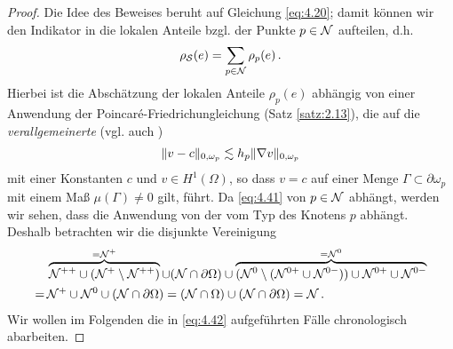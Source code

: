 \begin{proof}
Die Idee des Beweises beruht auf Gleichung \eqref{eq:4.20}; damit können wir den Indikator in die lokalen Anteile bzgl. der Punkte $p \in \mathcal N$ aufteilen, d.h.
\begin{align}\label{eq:4.40}
	\rho_{\mathcal S} (e) = \sum_{p \in \mathcal N} \rho_p (e) \, .
\end{align}
Hierbei ist die Abschätzung der lokalen Anteile $\rho_p(e)$ abhängig von einer Anwendung der Poincaré-Friedrichungleichung (Satz \ref{satz:2.13}), die auf die \textit{verallgemeinerte } (vgl. auch \cite{Rudin})
\begin{align}\label{eq:4.41}
	\lVert v-c\rVert_{0,\omega_p} \lesssim h_p \lVert \nabla v\rVert_{0,\omega_p}
\end{align}
mit einer Konstanten $c$ und $v\in H^1(\Omega)$, so dass $v=c$ auf einer Menge $\Gamma \subset \partial \omega_p$ mit einem Maß $\mu (\Gamma)\not= 0$ gilt, führt. Da \eqref{eq:4.41} von $p\in \mathcal N$ abhängt, werden wir sehen, dass die Anwendung von der  vom Typ des Knotens $p$ abhängt. Deshalb betrachten wir die disjunkte Vereinigung
\begin{align}\notag
	& \overbrace{\mathcal N^{++} \cup (\mathcal N^+ \setminus \mathcal N^{++})}^{=\mathcal N^+} \cup (\mathcal N \cap \partial \Omega ) \cup\overbrace{ (\mathcal N^0 \setminus (\mathcal N^{0+} \cup \mathcal N^{0-}))  \cup \mathcal N^{0+} \cup \mathcal N^{0-}}^{= \mathcal N^0} \\
	\label{eq:4.42}
	= \, & \mathcal N^+ \cup \mathcal N^0 \cup (\mathcal N \cap \partial \Omega)  = (\mathcal N \cap \Omega) \cup (\mathcal N \cap \partial \Omega) = \mathcal N \, .
\end{align}
Wir wollen im Folgenden die in \eqref{eq:4.42} aufgeführten Fälle chronologisch abarbeiten.


\end{proof}
